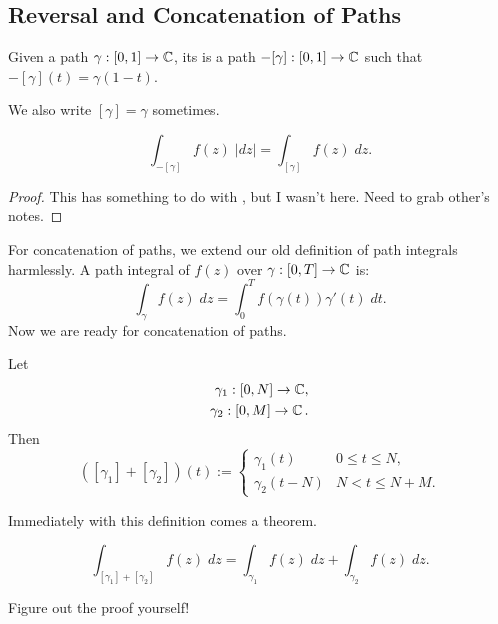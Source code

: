 \subsection{Reversal and Concatenation of Paths}

\begin{definition}
    Given a path $\gamma : [0,1] \to \operatorname{\mathbb{C}}$, its 
    is a path $-[\gamma] : [0,1] \to \operatorname{\mathbb{C}}$ such that 
    $-[\gamma](t) = \gamma(1-t)$.
\end{definition}
We also write $[\gamma] = \gamma$ sometimes.

\begin{theorem}
    \[ \int_{-[\gamma]} f(z) \; |dz| = \int_{[\gamma]} f(z) \; dz. \]
\end{theorem}

\begin{proof}
    This has something to do with , but I wasn't
    here. 
    Need to grab other's notes.
\end{proof}

For concatenation of paths, we extend our old definition of
path integrals harmlessly.
A path integral of $f(z)$ over $\gamma : [0,T] \to \operatorname{\mathbb{C}}$ is:
\[ \int_{\gamma} f(z) \; dz = \int_0^T f(\gamma(t)) \gamma'(t) \; dt. \]
Now we are ready for concatenation of paths.

\begin{definition}
    Let 
    \begin{align*}
        \gamma_1 : [0,N] \to \operatorname{\mathbb{C}}, \\
        \gamma_2 : [0,M] \to \operatorname{\mathbb{C}}.
    \end{align*}
    Then 
    \[ ([\gamma_1] + [\gamma_2])(t) := 
        \begin{cases}
            \gamma_1(t) & 0 \le t \le N, \\
            \gamma_2(t-N) & N < t \le N+M.
        \end{cases}
    \]
\end{definition}

Immediately with this definition comes a theorem.
\begin{theorem}
    \[ \int_{[\gamma_1] + [\gamma_2]} f(z) \; dz =
    \int_{\gamma_1} f(z) \; dz + \int_{\gamma_2} f(z) \; dz. \]
\end{theorem}

Figure out the proof yourself!


